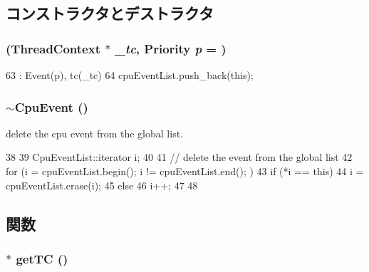 \subsection{コンストラクタとデストラクタ}
\hypertarget{classCpuEvent_ac2509f47e48618aceb1bbd19cddb51a7}{
\subsubsection[{CpuEvent}]{ ({\bf ThreadContext} $\ast$ {\em \_\-tc}, \/  {\bf Priority} {\em p} = {})}}
\label{classCpuEvent_ac2509f47e48618aceb1bbd19cddb51a7}



\begin{DoxyCode}
63         : Event(p), tc(_tc)
64     { cpuEventList.push_back(this); }
\end{DoxyCode}
\hypertarget{classCpuEvent_a258f48595df111cbfc722fb3aadcf3cf}{
\subsubsection[{$\sim$CpuEvent}]{\setlength{\rightskip}{0pt plus 5cm}$\sim${\bf CpuEvent} ()}}
\label{classCpuEvent_a258f48595df111cbfc722fb3aadcf3cf}
delete the cpu event from the global list. 


\begin{DoxyCode}
38 {
39     CpuEventList::iterator i;
40 
41     // delete the event from the global list
42     for (i = cpuEventList.begin(); i != cpuEventList.end(); ) {
43         if (*i == this)
44             i = cpuEventList.erase(i);
45         else
46             i++;
47     }
48 }
\end{DoxyCode}


\subsection{関数}
\hypertarget{classCpuEvent_a81894d15db5190d5364449a4915b76f5}{
\subsubsection[{getTC}]{$\ast$ getTC ()}}
\label{classCpuEvent_a81894d15db5190d5364449a4915b76f5}




